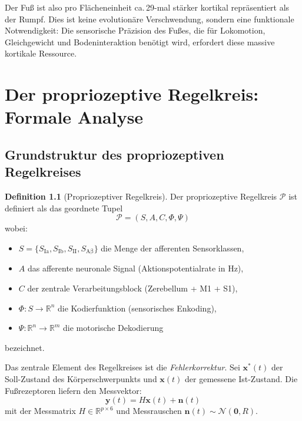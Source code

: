 ﻿\documentclass[12pt,a4paper]{report}
\theoremstyle{plain}
\theoremstyle{definition}
\newtheorem{definition}[theorem]{Definition}
\theoremstyle{remark}
\begin{document}
Der Fuß ist also pro Flächeneinheit ca.\,29-mal stärker kortikal repräsentiert
als der Rumpf. Dies ist keine evolutionäre Verschwendung, sondern eine
funktionale Notwendigkeit: Die sensorische Präzision des Fußes, die für
Lokomotion, Gleichgewicht und Bodeninteraktion benötigt wird, erfordert
diese massive kortikale Ressource.

\chapter{Der propriozeptive Regelkreis: Formale Analyse}

\section{Grundstruktur des propriozeptiven Regelkreises}

\begin{definition}[Propriozeptiver Regelkreis]
Der propriozeptive Regelkreis $\mathcal{P}$ ist definiert als das geordnete
Tupel
\[
  \mathcal{P} = (S, A, C, \Phi, \Psi)
\]
wobei:
\begin{itemize}
\item $S = \{S_{\mathrm{Ia}}, S_{\mathrm{Ib}}, S_{\mathrm{II}}, S_{\mathrm{A\beta}}\}$
  die Menge der afferenten Sensorklassen,
\item $A$ das afferente neuronale Signal (Aktionspotentialrate in Hz),
\item $C$ der zentrale Verarbeitungsblock (Zerebellum + M1 + S1),
\item $\Phi: S \to \mathbb{R}^n$ die Kodierfunktion (sensorisches Enkoding),
\item $\Psi: \mathbb{R}^n \to \mathbb{R}^m$ die motorische Dekodierung
\end{itemize}
bezeichnet.
\end{definition}

Das zentrale Element des Regelkreises ist die \emph{Fehlerkorrektur}.
Sei $\mathbf{x}^*(t)$ der Soll-Zustand des Körperschwerpunkts und
$\mathbf{x}(t)$ der gemessene Ist-Zustand. Die Fußrezeptoren liefern
den Messvektor:
\[
  \mathbf{y}(t) = H \mathbf{x}(t) + \mathbf{n}(t)
\]
mit der Messmatrix $H \in \mathbb{R}^{p \times 6}$ und Messrauschen
$\mathbf{n}(t) \sim \mathcal{N}(\mathbf{0}, R)$.
\end{document}
